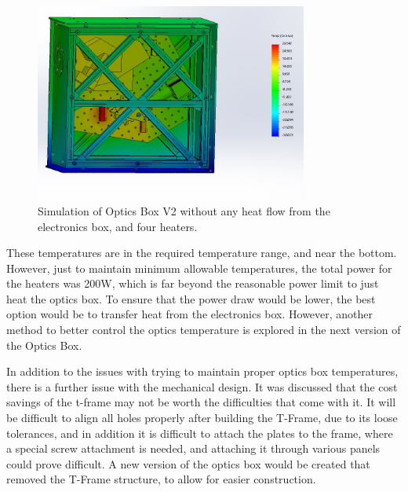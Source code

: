 \begin{figure}
    \centering
    \includegraphics[width=0.8\textwidth]{chap3_images/LIFE_V2_images/TA_-30_no_front_wall_four_heaters.JPG}
    \caption{Simulation of Optics Box V2 without any heat flow from the electronics box, and four heaters.}
    \label{fig:OB_V2_TA_4_4HEATERS}
\end{figure}

These temperatures are in the required temperature range, and near the bottom. However, just to maintain minimum allowable temperatures, the total power for the heaters was 200W, which is far beyond the reasonable power limit to just heat the optics box. To ensure that the power draw would be lower, the best option would be to transfer heat from the electronics box. However, another method to better control the optics temperature is explored in the next version of the Optics Box.

In addition to the issues with trying to maintain proper optics box temperatures, there is a further issue with the mechanical design. It was discussed that the cost savings of the t-frame may not be worth the difficulties that come with it. It will be difficult to align all holes properly after building the T-Frame, due to its loose tolerances, and in addition it is difficult to attach the plates to the frame, where a special screw attachment is needed, and attaching it through various panels could prove difficult. A new version of the optics box would be created that removed the T-Frame structure, to allow for easier construction.

